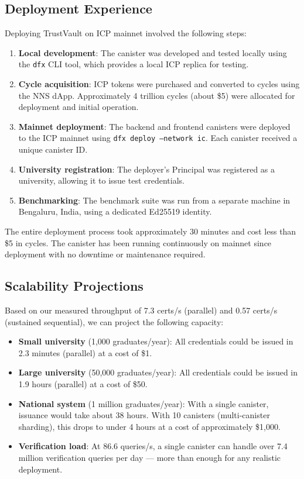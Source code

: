 \documentclass[conference]{IEEEtran}
\begin{document}
\subsection{Deployment Experience}

Deploying TrustVault on ICP mainnet involved the following steps:

\begin{enumerate}
  \item \textbf{Local development}: The canister was developed and tested locally using the \texttt{dfx} CLI tool, which provides a local ICP replica for testing.
  \item \textbf{Cycle acquisition}: ICP tokens were purchased and converted to cycles using the NNS dApp. Approximately 4 trillion cycles (about \$5) were allocated for deployment and initial operation.
  \item \textbf{Mainnet deployment}: The backend and frontend canisters were deployed to the ICP mainnet using \texttt{dfx deploy --network ic}. Each canister received a unique canister ID.
  \item \textbf{University registration}: The deployer's Principal was registered as a university, allowing it to issue test credentials.
  \item \textbf{Benchmarking}: The benchmark suite was run from a separate machine in Bengaluru, India, using a dedicated Ed25519 identity.
\end{enumerate}

The entire deployment process took approximately 30 minutes and cost less than \$5 in cycles. The canister has been running continuously on mainnet since deployment with no downtime or maintenance required.

\subsection{Scalability Projections}

Based on our measured throughput of 7.3 certs/s (parallel) and 0.57 certs/s (sustained sequential), we can project the following capacity:

\begin{itemize}[leftmargin=*]
  \item \textbf{Small university} (1,000 graduates/year): All credentials could be issued in 2.3 minutes (parallel) at a cost of \$1.
  \item \textbf{Large university} (50,000 graduates/year): All credentials could be issued in 1.9 hours (parallel) at a cost of \$50.
  \item \textbf{National system} (1 million graduates/year): With a single canister, issuance would take about 38 hours. With 10 canisters (multi-canister sharding), this drops to under 4 hours at a cost of approximately \$1,000.
  \item \textbf{Verification load}: At 86.6 queries/s, a single canister can handle over 7.4 million verification queries per day — more than enough for any realistic deployment.
\end{itemize}
\end{document}

